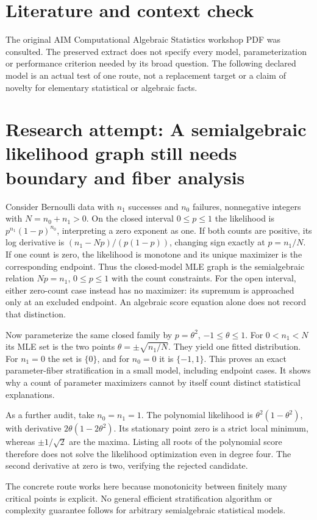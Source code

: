 \documentclass[11pt]{article}
\begin{document}
\section{Literature and context check}
The original AIM Computational Algebraic Statistics
 workshop PDF was consulted. The preserved extract does not specify every model,
 parameterization or performance criterion needed by its broad question. The
 following declared model is an actual test of one route, not a replacement
 target or a claim of novelty for elementary statistical or algebraic facts.
\section{Research attempt: A semialgebraic likelihood graph still needs boundary and fiber analysis}
Consider Bernoulli data with $n_1$ successes and $n_0$ failures, nonnegative
integers with $N=n_0+n_1>0$. On the closed interval $0\le p\le1$ the likelihood
is $p^{n_1}(1-p)^{n_0}$, interpreting a zero exponent as one. If both counts
are positive, its log derivative is $(n_1-Np)/(p(1-p))$, changing sign exactly
at $p=n_1/N$. If one count is zero, the likelihood is monotone and its unique
maximizer is the corresponding endpoint. Thus the closed-model MLE graph is
the semialgebraic relation $Np=n_1$, $0\le p\le1$ with the count constraints.
For the open interval, either zero-count case instead has no maximizer: its
supremum is approached only at an excluded endpoint. An algebraic score equation
alone does not record that distinction.

Now parameterize the same closed family by $p=\theta^2$, $-1\le\theta\le1$.
For $0<n_1<N$ its MLE set is the two points
$\theta=\pm\sqrt{n_1/N}$. They yield one fitted distribution. For $n_1=0$
the set is $\{0\}$, and for $n_0=0$ it is $\{-1,1\}$. This proves an exact
parameter-fiber stratification in a small model, including endpoint cases.
It shows why a count of parameter maximizers cannot by itself count distinct
statistical explanations.

As a further audit, take $n_0=n_1=1$. The polynomial likelihood is
$\theta^2(1-\theta^2)$, with derivative $2\theta(1-2\theta^2)$.
Its stationary point zero is a strict local minimum, whereas
$\pm1/\sqrt2$ are the maxima. Listing all roots of the polynomial score
therefore does not solve the likelihood optimization even in degree four.
The second derivative at zero is two, verifying the rejected candidate.

The concrete route works here because monotonicity between finitely many
critical points is explicit. No general efficient stratification algorithm or
complexity guarantee follows for arbitrary semialgebraic statistical models.
\end{document}
